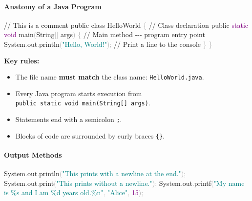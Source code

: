 \documentclass[
  justified,
  openright,
]{tufte-book}
\let\subsubsection\paragraph
\let\paragraph\paragraph
\newcommand{\BuiltInTok}[1]{#1}
\newcommand{\CommentTok}[1]{\textcolor{MidGray}{#1}}
\newcommand{\DataTypeTok}[1]{\textcolor{Purple}{#1}}
\newcommand{\DecValTok}[1]{\textcolor{Purple}{#1}}
\newcommand{\FunctionTok}[1]{\textcolor{BrandBlue}{#1}}
\newcommand{\KeywordTok}[1]{\textcolor{BrandBlue}{#1}}
\newcommand{\NormalTok}[1]{#1}
\newcommand{\OperatorTok}[1]{\textcolor{DarkGray}{#1}}
\newcommand{\SpecialCharTok}[1]{\textcolor{Teal}{#1}}
\newcommand{\StringTok}[1]{\textcolor{Teal}{#1}}
\newenvironment{Shaded}{%
  \begin{snugshade}
}{%
  \end{snugshade}
}
\let\subsubsection\paragraph
\let\paragraph\paragraph
\providecommand{\tightlist}{%
  \setlength{\itemsep}{0pt}\setlength{\parskip}{0pt}}
\begin{document}
\subsubsection{Anatomy of a Java
Program}\label{anatomy-of-a-java-program}

\begin{Shaded}
\begin{Highlighting}[]
\CommentTok{// This is a comment}
\KeywordTok{public} \KeywordTok{class}\NormalTok{ HelloWorld }\OperatorTok{\{}                    \CommentTok{// Class declaration}
    \KeywordTok{public} \DataTypeTok{static} \DataTypeTok{void} \FunctionTok{main}\OperatorTok{(}\BuiltInTok{String}\OperatorTok{[]}\NormalTok{ args}\OperatorTok{)} \OperatorTok{\{} \CommentTok{// Main method {-}{-}{-} program entry point}
        \BuiltInTok{System}\OperatorTok{.}\FunctionTok{out}\OperatorTok{.}\FunctionTok{println}\OperatorTok{(}\StringTok{"Hello, World!"}\OperatorTok{);} \CommentTok{// Print a line to the console}
    \OperatorTok{\}}
\OperatorTok{\}}
\end{Highlighting}
\end{Shaded}

\textbf{Key rules:}

\begin{itemize}
\tightlist
\item
  The file name \textbf{must match} the class name:
  \texttt{HelloWorld.java}.
\item
  Every Java program starts execution from
  \texttt{public\ static\ void\ main(String{[}{]}\ args)}.
\item
  Statements end with a semicolon \texttt{;}.
\item
  Blocks of code are surrounded by curly braces \texttt{\{\}}.
\end{itemize}

\subsubsection{Output Methods}\label{output-methods}

\begin{Shaded}
\begin{Highlighting}[]
\BuiltInTok{System}\OperatorTok{.}\FunctionTok{out}\OperatorTok{.}\FunctionTok{println}\OperatorTok{(}\StringTok{"This prints with a newline at the end."}\OperatorTok{);}
\BuiltInTok{System}\OperatorTok{.}\FunctionTok{out}\OperatorTok{.}\FunctionTok{print}\OperatorTok{(}\StringTok{"This prints without a newline."}\OperatorTok{);}
\BuiltInTok{System}\OperatorTok{.}\FunctionTok{out}\OperatorTok{.}\FunctionTok{printf}\OperatorTok{(}\StringTok{"My name is }\SpecialCharTok{\%s}\StringTok{ and I am }\SpecialCharTok{\%d}\StringTok{ years old.}\SpecialCharTok{\%n}\StringTok{"}\OperatorTok{,} \StringTok{"Alice"}\OperatorTok{,} \DecValTok{15}\OperatorTok{);}
\end{Highlighting}
\end{Shaded}
\end{document}
